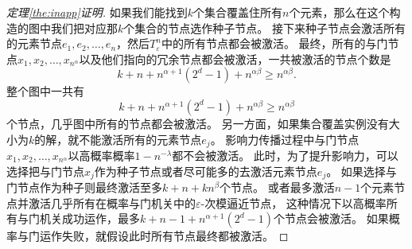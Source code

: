 \begin{proof}[定理\ref{the:inapp}证明]
如果我们能找到$k$个集合覆盖住所有$n$个元素，那么在这个构造的图中我们把对应那$k$个集合的节点选作种子节点。
接下来种子节点会激活所有的元素节点$e_1, e_2, \dots, e_n$，然后$T_\varepsilon^n$中的所有节点都会被激活。
最终，所有的与门节点$x_1, x_2, \dots, x_{n^\alpha}$以及他们指向的冗余节点都会被激活，一共被激活的节点个数是
$$k+n+n^{\alpha+1}(2^d-1)+n^{\alpha\beta} \geq n^{\alpha\beta}.$$
整个图中一共有
$$k+n+n^{\alpha+1}(2^d-1)+n^{\alpha\beta} \geq n^{\alpha\beta}$$
个节点，几乎图中所有的节点都会被激活。
另一方面，如果集合覆盖实例没有大小为$k$的解，就不能激活所有的元素节点$e_j$。
影响力传播过程中与门节点$x_1, x_2, \dots, x_{n^\alpha}$以高概率概率$1-n^{-\lambda}$都不会被激活。
此时，为了提升影响力，可以选择把与门节点$x_j$作为种子节点或者尽可能多的去激活元素节点$e_j$。
如果选择与门节点作为种子则最终激活至多$k+n+kn^{\beta}$个节点。
或者最多激活$n-1$个元素节点并激活几乎所有在概率与门机关中的$\varepsilon$-次模逼近节点，
这种情况下以高概率所有与门机关成功运作，最多$k+n-1+n^{\alpha+1}(2^d-1)$个节点会被激活。
如果概率与门运作失败，就假设此时所有节点最终都被激活。


\end{proof}
